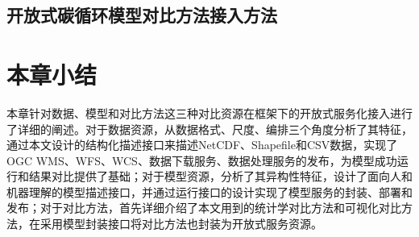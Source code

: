 \subsection{开放式碳循环模型对比方法接入方法}


\section{本章小结}
本章针对数据、模型和对比方法这三种对比资源在框架下的开放式服务化接入进行了详细的阐述。对于数据资源，从数据格式、尺度、编排三个角度分析了其特征，通过本文设计的结构化描述接口来描述NetCDF、Shapefile和CSV数据，实现了OGC WMS、WFS、WCS、数据下载服务、数据处理服务的发布，为模型成功运行和结果对比提供了基础；对于模型资源，分析了其异构性特征，设计了面向人和机器理解的模型描述接口，并通过运行接口的设计实现了模型服务的封装、部署和发布；对于对比方法，首先详细介绍了本文用到的统计学对比方法和可视化对比方法，在采用模型封装接口将对比方法也封装为开放式服务资源。